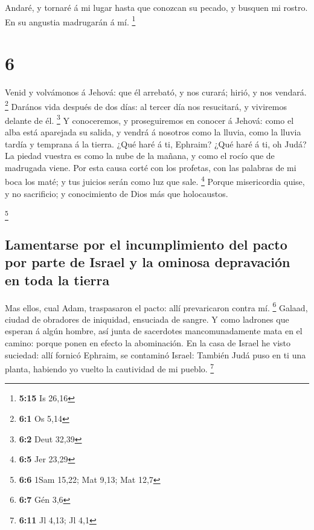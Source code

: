  Andaré, y tornaré á mi lugar hasta que conozcan su
pecado, y busquen mi rostro. En su angustia madrugarán á mí. \footnote{\textbf{5:15}
  Is 26,16}

\hypertarget{section-5}{%
\section{6}\label{section-5}}

 Venid y volvámonos á Jehová: que él arrebató, y nos
curará; hirió, y nos vendará. \footnote{\textbf{6:1} Os 5,14}
 Darános vida después de dos días: al tercer día nos
resucitará, y viviremos delante de él. \footnote{\textbf{6:2} Deut 32,39}
 Y conoceremos, y proseguiremos en conocer á Jehová: como
el alba está aparejada su salida, y vendrá á nosotros como la lluvia,
como la lluvia tardía y temprana á la tierra.  ¿Qué haré á
ti, Ephraim? ¿Qué haré á ti, oh Judá? La piedad vuestra es como la nube
de la mañana, y como el rocío que de madrugada viene.  Por
esta causa corté con los profetas, con las palabras de mi boca los maté;
y tus juicios serán como luz que sale. \footnote{\textbf{6:5} Jer 23,29}
 Porque misericordia quise, y no sacrificio; y
conocimiento de Dios más que holocaustos.

\footnote{\textbf{6:6} 1Sam 15,22; Mat 9,13; Mat 12,7}

\hypertarget{lamentarse-por-el-incumplimiento-del-pacto-por-parte-de-israel-y-la-ominosa-depravaciuxf3n-en-toda-la-tierra}{%
\subsection{Lamentarse por el incumplimiento del pacto por parte de
Israel y la ominosa depravación en toda la
tierra}\label{lamentarse-por-el-incumplimiento-del-pacto-por-parte-de-israel-y-la-ominosa-depravaciuxf3n-en-toda-la-tierra}}

 Mas ellos, cual Adam, traspasaron el pacto: allí
prevaricaron contra mí. \footnote{\textbf{6:7} Gén 3,6} 
Galaad, ciudad de obradores de iniquidad, ensuciada de sangre.
 Y como ladrones que esperan á algún hombre, así junta de
sacerdotes mancomunadamente mata en el camino: porque ponen en efecto la
abominación.  En la casa de Israel he visto suciedad:
allí fornicó Ephraim, se contaminó Israel:  También Judá
puso en ti una planta, habiendo yo vuelto la cautividad de mi pueblo.
\footnote{\textbf{6:11} Jl 4,13; Jl 4,1}

